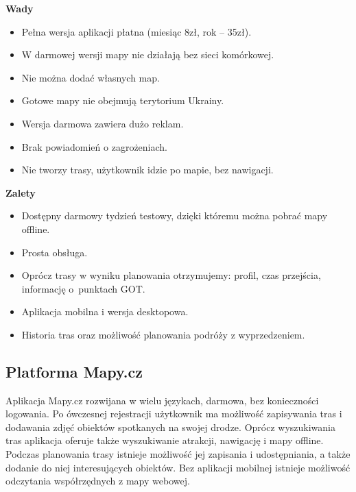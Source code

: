 \noindent
\textbf{Wady}
\begin{itemize}
    \item Pełna wersja aplikacji płatna (miesiąc 8zł, rok – 35zł).
    \item W darmowej wersji mapy nie działają bez sieci komórkowej.
    \item Nie można dodać własnych map.
    \item Gotowe mapy nie obejmują terytorium Ukrainy.
    \item Wersja darmowa zawiera dużo reklam.
    \item Brak powiadomień o zagrożeniach.
    \item Nie tworzy trasy, użytkownik idzie po mapie, bez nawigacji.
\end{itemize}
\textbf{Zalety}
\begin{itemize}
    \item Dostępny darmowy tydzień testowy, dzięki któremu można pobrać mapy offline.
    \item Prosta obsługa.
    \item Oprócz trasy w wyniku planowania otrzymujemy: profil, czas przejścia, informację o~punktach GOT.
    \item Aplikacja mobilna i wersja desktopowa.
    \item Historia tras oraz możliwość planowania podróży z wyprzedzeniem.
\end{itemize}

\subsection{Platforma Mapy.cz}
Aplikacja Mapy.cz \cite{mapycz} rozwijana w wielu językach, darmowa, bez konieczności logowania. Po ówczesnej rejestracji użytkownik ma możliwość zapisywania tras i dodawania zdjęć obiektów spotkanych na swojej drodze. Oprócz wyszukiwania tras aplikacja oferuje także wyszukiwanie atrakcji, nawigację i mapy offline. Podczas planowania trasy istnieje możliwość jej zapisania i udostępniania, a także dodanie do niej interesujących obiektów. Bez aplikacji mobilnej istnieje możliwość odczytania współrzędnych z mapy webowej.

